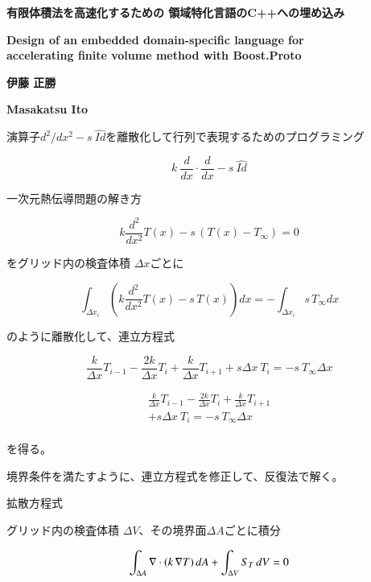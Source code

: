 \documentclass[a4j,11pt]{jarticle}
\begin{document}
\renewcommand{\baselinestretch}{1.12}\small\normalsize
\begin{center}
  \textbf{\Large 有限体積法を高速化するための 領域特化言語のC++への埋め込み}
  
  \textbf{\large Design of an embedded domain-specific language for\\ 
accelerating finite volume method with Boost.Proto}
\end{center}
\begin{center}  
  \textbf{伊藤 正勝}

  \textbf{Masakatsu Ito}

\end{center}

演算子\(  d^2 / dx^2 - s\ \hat{Id} \)を離散化して行列で表現するためのプログラミング

\[ k \ \frac{d}{dx} \cdot  \frac{d}{dx} - s\ \hat{Id}  \]


一次元熱伝導問題の解き方

\[ k \frac{d^2}{dx^2} T(x) - s \, ( T(x) - T_\infty ) = 0    \]

をグリッド内の検査体積 \(\Delta x\)ごとに

\[ \int_{\Delta x_i} \left(  k \frac{d^2}{dx^2} T(x) - s \, T(x)   \right) dx =  - \int_{\Delta x_i} s \, T_\infty dx  \]

のように離散化して、連立方程式

\[ \frac{k}{\Delta x} T_{i-1} - \frac{2 k}{\Delta x}T_i +  \frac{k}{\Delta x} T_{i+1} + s  \Delta x\ T_i =  - s\ T_\infty \Delta x   \]


\begin{eqnarray}
\frac{k}{\Delta x} T_{i-1} - \frac{2 k}{\Delta x}T_i +  \frac{k}{\Delta x} T_{i+1}    \\
 +  s  \Delta x\ T_i  =  - s\ T_\infty \Delta x  \\
\end{eqnarray}


を得る。


境界条件を満たすように、連立方程式を修正して、反復法で解く。



拡散方程式

グリッド内の検査体積 \(\Delta V\)、その境界面\(\Delta A\)ごとに積分


\[ \int_{\Delta A} {\bf \nabla} \cdot ( k \,  {\bf \nabla} T )\, dA + \int_{\Delta V} S_T \,dV  = 0 \]
\end{document}
